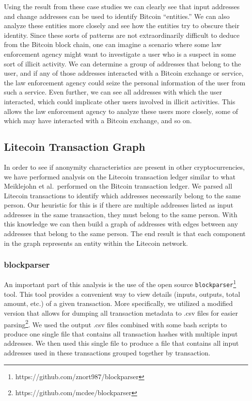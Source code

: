 \documentclass[11pt]{article}
\begin{document}
Using the result from these case studies we can clearly see that input addresses and change addresses can be used to
identify Bitcoin ``entities.'' We can also analyze these entities more closely and see how the entities try to obscure
their identity. Since these sorts of patterns are not extraordinarily difficult to deduce from the Bitcoin block chain,
one can imagine a scenario where some law enforcement agency might want to investigate a user who is a suspect in some
sort of illicit activity. We can determine a group of addresses that belong to the user, and if any of those addresses
interacted with a Bitcoin exchange or service, the law enforcement agency could seize the personal information of the
user from such a service. Even further, we can see all addresses with which the user interacted, which could implicate
other users involved in illicit activities. This allows the law enforcement agency to analyze these users more closely,
some of which may have interacted with a Bitcoin exchange, and so on.

\subsection{Litecoin Transaction Graph}
In order to see if anonymity characteristics are present in other cryptocurrencies, we have performed analysis on the
Litecoin transaction ledger similar to what \mbox{Meiklejohn} et al.\ performed on the Bitcoin transaction
ledger\cite{meiklejohn13}. We parsed all Litecoin transactions to identify which addresses necessarily belong to the
same person. Our heuristic for this is if there are multiple addresses listed as input addresses in the same
transaction, they must belong to the same person. With this knowledge we can then build a graph of addresses with edges
between any addresses that belong to the same person. The end result is that each component in the graph represents an
entity within the Litecoin network.

\subsubsection{blockparser}
An important part of this analysis is the use of the open source \texttt{blockparser}\footnote{https://github.com/znort987/blockparser} tool. This tool provides a convenient way to view details (inputs,
outputs, total amount, etc.) of a given transaction. More specifically, we utilized a modified version that allows for
dumping all transaction metadata to .csv files for easier parsing\footnote{https://github.com/mcdee/blockparser}. We
used the output .csv files combined with some bash scripts to produce one single file that contains all transaction
hashes with multiple input addresses. We then used this single file to produce a file that contains all input addresses
used in these transactions grouped together by transaction.
\end{document}
